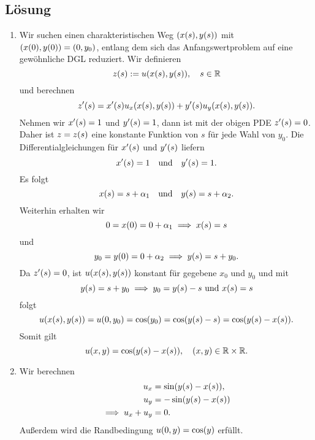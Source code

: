 \documentclass{exercise}
\begin{document}
    \subsection*{Lösung}
    \begin{enumerate}
        \item Wir suchen einen charakteristischen Weg \(\parentheses*{x\parentheses*{s}, y\parentheses*{s}}\) mit \(\parentheses*{x\parentheses*{0}, y\parentheses*{0}} = \parentheses*{0, y_0}\), entlang dem sich das Anfangswertproblem auf eine gewöhnliche DGL reduziert.
        Wir definieren
        \[
            z\parentheses*{s} := u\parentheses*{x\parentheses*{s}, y\parentheses*{s}}, \quad s \in \R
        \]
        und berechnen
        \[
            z'\parentheses*{s} = x'\parentheses*{s}u_x\parentheses*{x\parentheses*{s}, y\parentheses*{s}} + y'\parentheses*{s}u_y\parentheses*{x\parentheses*{s}, y\parentheses*{s}}.
        \]
        Nehmen wir \(x'\parentheses*{s} = 1\) und \(y'\parentheses*{s} = 1\), dann ist mit der obigen PDE \(z'\parentheses*{s} = 0\).
        Daher ist \(z = z\parentheses*{s}\) eine konstante Funktion von \(s\) für jede Wahl von \(y_0\).
        Die Differentialgleichungen für \(x'\parentheses*{s}\) und \(y'\parentheses*{s}\) liefern
        \[
            x'\parentheses*{s} = 1 \quad \text{und} \quad y'\parentheses*{s} = 1.
        \]
        Es folgt
        \[
            x\parentheses*{s} = s + \alpha_1 \quad \text{und} \quad y\parentheses*{s} = s + \alpha_2.
        \]
        Weiterhin erhalten wir
        \[
            0 = x\parentheses*{0} = 0 + \alpha_1 \implies x\parentheses*{s} = s
        \]
        und
        \[
            y_0 = y\parentheses*{0} = 0 + \alpha_2 \implies y\parentheses*{s} = s + y_0.
        \]
        Da \(z'\parentheses*{s} = 0\), ist \(u\parentheses*{x\parentheses*{s}, y\parentheses*{s}}\) konstant für gegebene \(x_0\) und \(y_0\) und mit
        \[
            y\parentheses*{s} = s + y_0 \implies y_0 = y\parentheses*{s} - s\text{ und }x\parentheses*{s} = s
        \]
        folgt
        \[
            u\parentheses*{x\parentheses*{s}, y\parentheses*{s}} = u\parentheses*{0, y_0} = \cos\parentheses*{y_0} = \cos\parentheses*{y\parentheses*{s} - s} = \cos\parentheses*{y\parentheses*{s} - x\parentheses*{s}}.
        \]
        Somit gilt
        \[
            u\parentheses*{x, y} = \cos\parentheses*{y\parentheses*{s} - x\parentheses*{s}}, \quad \parentheses*{x, y} \in \R \times \R.
        \]
        \item Wir berechnen
        \begin{align*}
            u_x &= \sin\parentheses*{y\parentheses*{s} - x\parentheses*{s}},\\
            u_y &= -\sin\parentheses*{y\parentheses*{s} - x\parentheses*{s}}\\
            \implies u_x + u_y &= 0.
        \end{align*}
        Außerdem wird die Randbedingung \(u\parentheses*{0, y} = \cos\parentheses*{y}\) erfüllt.
    \end{enumerate}
\end{document}
